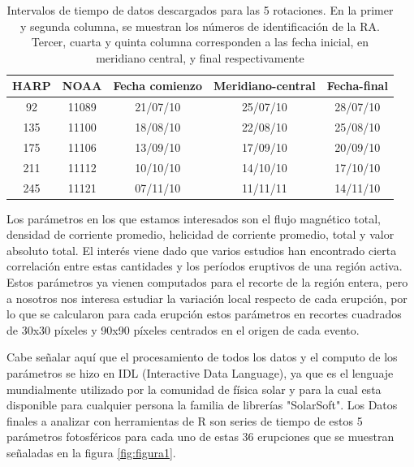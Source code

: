 \documentclass[12pt,a4paper,spanish]{article}
\begin{document}
\begin{table}[h!]
\begin{center}
\begin{tabular}{ |c|c|c|c|c| } 
 \hline
  HARP & NOAA & Fecha comienzo & Meridiano-central & Fecha-final \\
 \hline
  92 & 11089 & 21/07/10 & 25/07/10 & 28/07/10 \\ 
  \hline
 135 & 11100 & 18/08/10 & 22/08/10 & 25/08/10 \\ 
  \hline
 175 & 11106 & 13/09/10 & 17/09/10 & 20/09/10 \\ 
 \hline
 211 & 11112 & 10/10/10 & 14/10/10 & 17/10/10 \\
 \hline
 245 & 11121 & 07/11/10 & 11/11/11 & 14/11/10 \\
 \hline
\end{tabular}
\caption{Intervalos de tiempo de datos descargados para las 5 rotaciones. En la primer y segunda columna, se muestran los números de identificación de la RA. Tercer, cuarta y quinta columna corresponden a las fecha inicial, en meridiano central, y final respectivamente}
\label{tabla:1}
\end{center}
\end{table}

Los parámetros en los que estamos interesados son el flujo magnético total, densidad de corriente promedio, helicidad de corriente promedio, total y valor absoluto total. El interés viene dado que varios estudios han encontrado cierta correlación entre estas cantidades y los períodos eruptivos de una región activa. Estos parámetros ya vienen computados para el recorte de la región entera, pero a nosotros nos interesa estudiar la variación local respecto de cada erupción, por lo que se calcularon para cada erupción estos parámetros en recortes cuadrados de 30x30 píxeles y 90x90 píxeles centrados en el origen de cada evento.\par
\newpage
Cabe señalar aquí que el procesamiento de todos los datos y el computo de los parámetros se hizo en IDL (Interactive Data Language), ya que es el lenguaje mundialmente utilizado por la comunidad de física solar y para la cual esta disponible para cualquier persona la familia de librerías "SolarSoft". Los Datos finales a analizar con herramientas de R son series de tiempo de estos 5 parámetros fotosféricos para cada uno de estas 36 erupciones que se muestran señaladas en la figura \ref{fig:figura1}.
\end{document}
